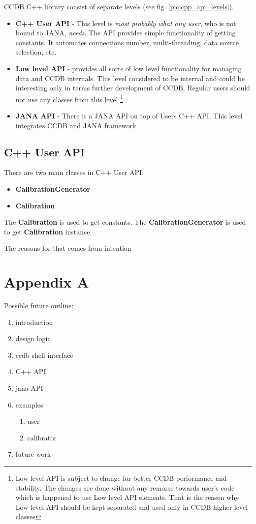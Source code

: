 \documentclass{article}
\begin{document}
CCDB C++ library consist of separate levels (see fig. \ref{pic:cpp_api_levels}).
\begin{itemize}
\item \textbf{C++ User API} - This level is \textit{most probably what any user},
      who is not bound to JANA, \textit{needs}. The API provides simple
      functionality of getting  constants. It automates connections number,
      multi-threading, data source selection, etc.

\item \textbf{Low level API} - provides all sorts of low level functionality for
       managing data and CCDB internals. This level considered to be internal
       and could be interesting only in terms further development of CCDB.
       Regular users should not use any classes from this level
       \footnote{Low level API is subject to change for better CCDB performance
                 and stability. The changes are done without any
                 remorse towards user's code which is happened to use Low
                 level API elements. That is the reason why Low level API
                 should be kept separated and used only in CCDB higher level
                 classes}.

\item \textbf{JANA API} - There is a JANA API on top of Users C++ API. This
      level integrates CCDB and JANA framework.
\end{itemize}


\subsection{C++ User API}

There are two main classes in C++ User API:

\begin{itemize}
  \item \textbf{CalibrationGenerator}
  \item \textbf{Calibration}
\end{itemize}
The \textbf{Calibration} is used to get constants.
The \textbf{CalibrationGenerator} is used to get \textbf{Calibration} instance.




The reasons for that comes from intention


\section{Appendix A}

Possible future outline:

\begin{enumerate}
\item introduction
\item design logic
\item ccdb shell interface
\item C++ API
\item jana API
\item examples
  \begin{enumerate}
  \item user
  \item calibrator
  \end{enumerate}
\item future work
\end{enumerate}
\end{document}
